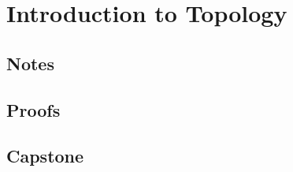 \chapter{Introduction to Topology}

\section{Notes}


\clearpage

\section{Proofs}


\section{Capstone}

